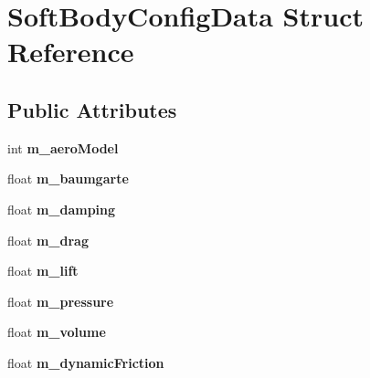 \hypertarget{structSoftBodyConfigData}{}\section{Soft\+Body\+Config\+Data Struct Reference}
\label{structSoftBodyConfigData}
\subsection*{Public Attributes}
\begin{DoxyCompactItemize}
\item 
\mbox{\label{structSoftBodyConfigData_af2658e3b77549dcfd3d85ce1dc2d92ae}} 
int {\bfseries m\+\_\+aero\+Model}
\item 
\mbox{\label{structSoftBodyConfigData_a498bc0c3b1ced84d6ad8f21f24a5e18e}} 
float {\bfseries m\+\_\+baumgarte}
\item 
\mbox{\label{structSoftBodyConfigData_ad45a4d2f1fb499325343d4954fee0537}} 
float {\bfseries m\+\_\+damping}
\item 
\mbox{\label{structSoftBodyConfigData_adc2ac27dbb0db792daa3f6d120bbd118}} 
float {\bfseries m\+\_\+drag}
\item 
\mbox{\label{structSoftBodyConfigData_a981dc64e5571bb7b3b3a5443eddcd492}} 
float {\bfseries m\+\_\+lift}
\item 
\mbox{\label{structSoftBodyConfigData_a4e9e6bb725f91559338f49cbaecbd350}} 
float {\bfseries m\+\_\+pressure}
\item 
\mbox{\label{structSoftBodyConfigData_a5a0c0833698912cf0788cc8d79afec2d}} 
float {\bfseries m\+\_\+volume}
\item 
\mbox{\label{structSoftBodyConfigData_ac042580ed222c57d634b571d3429ef98}} 
float {\bfseries m\+\_\+dynamic\+Friction}
\item 
\mbox{\label{structSoftBodyConfigData_aa54217fde437f8b17133c5256fafd1be}} 

\end{DoxyCompactItemize}
